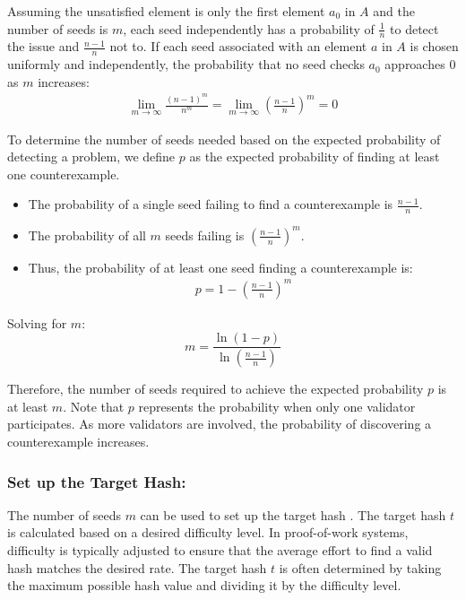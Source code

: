 \documentclass[runningheads]{llncs}
\begin{document}
Assuming the unsatisfied element is only the first element \( a_0 \) in \( A \) and the number of seeds is \( m \), each seed independently has a probability of \( \frac{1}{n} \) to detect the issue and \( \frac{n-1}{n} \) not to. If each seed associated with an element \( a \) in \( A \) is chosen uniformly and independently, the probability that no seed checks \( a_0 \) approaches 0 as \( m \) increases:
\begin{gather*}
\lim_{m \to \infty} \frac{(n-1)^m}{n^m} = \lim_{m \to \infty} \left( \frac{n-1}{n} \right)^m = 0
\end{gather*}

To determine the number of seeds needed based on the expected probability of detecting a problem, we define \( p \) as the expected probability of finding at least one counterexample. 
\begin{itemize}
    \item The probability of a single seed failing to find a counterexample is \( \frac{n-1}{n} \).
    \item The probability of all \( m \) seeds failing is \( \left( \frac{n-1}{n} \right)^m \).
    \item Thus, the probability of at least one seed finding a counterexample is:
\begin{gather*}
  p = 1 - \left( \frac{n-1}{n} \right)^m
\end{gather*}
\end{itemize}
Solving for \( m \):
\begin{equation}
\label{eq:12}
m = \frac{\ln(1 - p)}{\ln\left( \frac{n-1}{n} \right)}
\end{equation}

Therefore, the number of seeds required to achieve the expected probability \( p \) is at least \( m \). Note that \( p \) represents the probability when only one validator participates. As more validators are involved, the probability of discovering a counterexample increases.
\subsubsection{Set up the Target Hash:}
The number of seeds \( m \) can be used to set up the target hash \cite{nakamoto2008bitcoin,bonneau2015sok}. The target hash \( t \) is calculated based on a desired difficulty level. In proof-of-work systems, difficulty is typically adjusted to ensure that the average effort to find a valid hash matches the desired rate. The target hash \( t \) is often determined by taking the maximum possible hash value and dividing it by the difficulty level.
\end{document}
